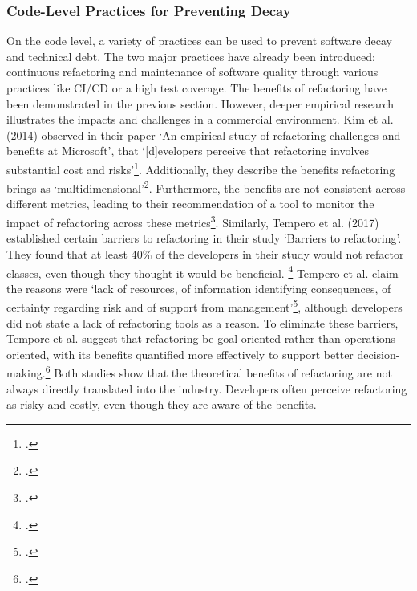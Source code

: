\subsubsection{Code-Level Practices for Preventing Decay}
On the code level, a variety of practices can be used to prevent software decay and technical debt. The two major practices have already been introduced: continuous refactoring and maintenance of software quality through various practices like CI/CD or a high test coverage.
The benefits of refactoring have been demonstrated in the previous section. However, deeper empirical research illustrates the impacts and challenges in a commercial environment.
Kim et al. (2014) observed in their paper `An empirical study of refactoring challenges and benefits at Microsoft', that `[d]evelopers perceive that refactoring involves substantial cost and risks'\footcite[17]{kimEmpiricalStudyRefactoring2014}.
Additionally, they describe the benefits refactoring brings as `multidimensional'\footcite[17]{kimEmpiricalStudyRefactoring2014}. Furthermore, the benefits are not consistent across different metrics, leading to their recommendation of a tool to monitor the impact of refactoring across these metrics\footcite[17]{kimEmpiricalStudyRefactoring2014}.
Similarly, Tempero et al. (2017) established certain barriers to refactoring in their study `Barriers to refactoring'. They found that at least 40\% of the developers in their study would not refactor classes, even though they thought it would be beneficial. \footcite[60]{temperoBarriersRefactoring2017}
Tempero et al. claim the reasons were `lack of resources, of information identifying consequences, of certainty regarding risk and of support from management'\footcite[60]{temperoBarriersRefactoring2017}, although developers did not state a lack of refactoring tools as a reason.
To eliminate these barriers, Tempore et al. suggest that refactoring be goal-oriented rather than operations-oriented, with its benefits quantified more effectively to support better decision-making.\footcite[61]{temperoBarriersRefactoring2017}
Both studies show that the theoretical benefits of refactoring are not always directly translated into the industry. Developers often perceive refactoring as risky and costly, even though they are aware of the benefits.

